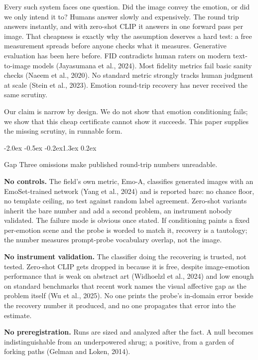 \documentclass[10pt]{article}
\makeatletter
\renewcommand\section{\@startsection{section}{1}{\z@}%
  {-2.0ex \@plus -0.5ex \@minus -0.2ex}{1.3ex \@plus 0.2ex}{\large\bfseries\raggedright}}
\makeatother
\begin{document}
Every such system faces one question. Did the image convey the emotion, or did we only intend it to? Humans answer slowly and expensively. The round trip answers instantly, and with zero-shot CLIP it answers in one forward pass per image. That cheapness is exactly why the assumption deserves a hard test: a free measurement spreads before anyone checks what it measures. Generative evaluation has been here before. FID contradicts human raters on modern text-to-image models (Jayasumana et al., 2024). Most fidelity metrics fail basic sanity checks (Naeem et al., 2020). No standard metric strongly tracks human judgment at scale (Stein et al., 2023). Emotion round-trip recovery has never received the same scrutiny.

Our claim is narrow by design. We do not show that emotion conditioning fails; we show that this cheap certificate cannot show it succeeds. This paper supplies the missing scrutiny, in runnable form.

\section{Gap}
Three omissions make published round-trip numbers unreadable.

\textbf{No controls.} The field's own metric, Emo-A, classifies generated images with an EmoSet-trained network (Yang et al., 2024) and is reported bare: no chance floor, no template ceiling, no test against random label agreement. Zero-shot variants inherit the bare number and add a second problem, an instrument nobody validated. The failure mode is obvious once stated. If conditioning paints a fixed per-emotion scene and the probe is worded to match it, recovery is a tautology; the number measures prompt-probe vocabulary overlap, not the image.

\textbf{No instrument validation.} The classifier doing the recovering is trusted, not tested. Zero-shot CLIP gets dropped in because it is free, despite image-emotion performance that is weak on abstract art (Widhoelzl et al., 2024) and low enough on standard benchmarks that recent work names the visual affective gap as the problem itself (Wu et al., 2025). No one prints the probe's in-domain error beside the recovery number it produced, and no one propagates that error into the estimate.

\textbf{No preregistration.} Runs are sized and analyzed after the fact. A null becomes indistinguishable from an underpowered shrug; a positive, from a garden of forking paths (Gelman and Loken, 2014).
\end{document}
